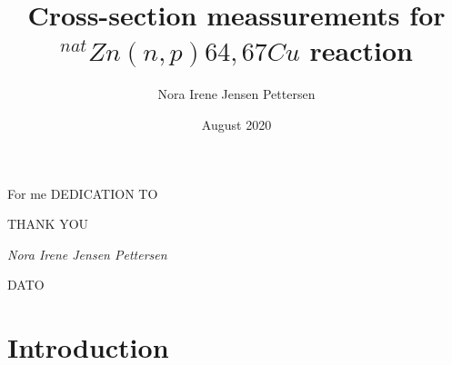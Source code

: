 \documentclass[twoside,english]{uiofysmaster/uiofysmaster}
\author{Nora Irene Jensen Pettersen}
\title{Cross-section meassurements for  $^{nat}Zn(n,p)64,67Cu$ reaction
}
\date{August 2020}
\begin{document}
\setlength{\belowdisplayskip}{12pt} \setlength{\belowdisplayshortskip}{12pt}
\setlength{\abovedisplayskip}{12pt} \setlength{\abovedisplayshortskip}{12pt}

\maketitle


\begin{abstract}




\end{abstract}

\begin{dedication}
  For me
  \vspace{12pt}
  DEDICATION TO
    
  
\end{dedication}



\begin{acknowledgements}
THANK YOU

  \vspace{1.5cm}
  
  \noindent\textit{Nora Irene Jensen Pettersen}
  
  \noindent DATO
  
\end{acknowledgements}

\tableofcontents



\chapter{Introduction}
\end{document}
